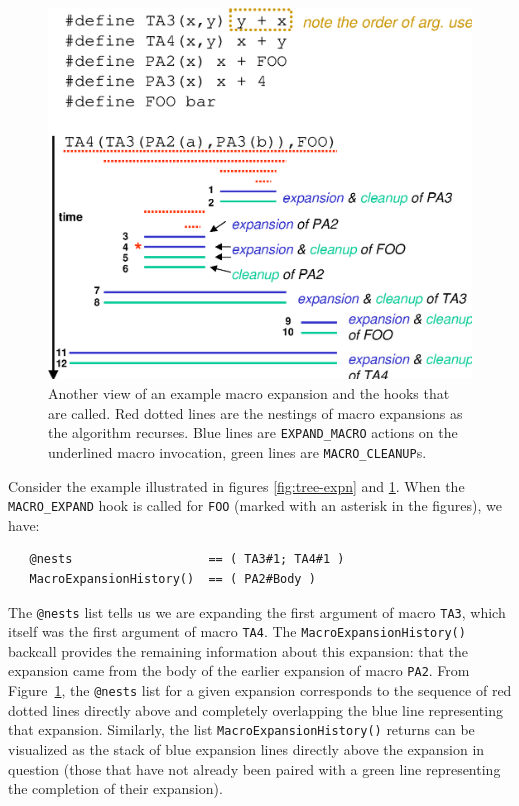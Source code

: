 \documentclass{article}
\newcommand{\figref}[1]{Figure~\ref{#1}}
\begin{document}
\begin{figure}[p]
  \begin{center}
    \leavevmode
    \includegraphics[width=0.45\linewidth]{figs/text-expn.eps}
    \caption{Another view of an example macro expansion and the hooks
    that are called.  Red dotted lines are the nestings of macro
    expansions as the algorithm recurses.  Blue lines are
    \texttt{EXPAND\_MACRO} actions on the underlined macro invocation,
    green lines are \texttt{MACRO\_CLEANUP}s.}
    \label{fig:text-expn}
  \end{center}
\end{figure}

Consider the example illustrated in figures \ref{fig:tree-expn} and
\ref{fig:text-expn}.  When the \texttt{MACRO\_EXPAND} hook is called for
\texttt{FOO} (marked with an asterisk in the figures), we have:

\begin{verbatim}
   @nests                   == ( TA3#1; TA4#1 )
   MacroExpansionHistory()  == ( PA2#Body )
\end{verbatim}

\noindent The \texttt{@nests} list tells us we are expanding the first
argument of macro \texttt{TA3}, which itself was the first argument of
macro \texttt{TA4}.  The \texttt{MacroExpansionHistory()} backcall
provides the remaining information about this expansion: that the
expansion came from the body of the earlier expansion of macro
\texttt{PA2}.  From \figref{fig:text-expn}, the \texttt{@nests} list
for a given expansion corresponds to the sequence of red dotted lines
directly above and completely overlapping the blue line representing
that expansion.  Similarly, the list \texttt{MacroExpansionHistory()}
returns can be visualized as the stack of blue expansion
lines directly above the expansion in question (those that have not
already been paired with a green line representing the completion of
their expansion).

\end{document}
